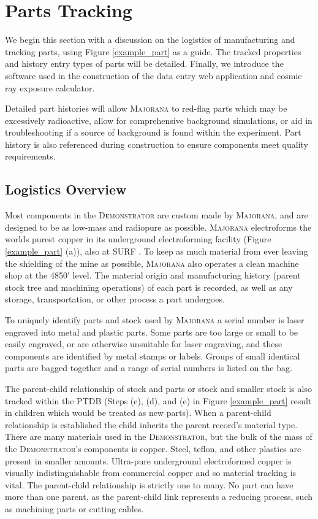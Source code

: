 \documentclass[journal]{IEEEtran}
\begin{document}
\section{Parts Tracking}
We begin this section with a discussion on the logistics of manufacturing and tracking parts, using Figure \ref{example_part}
as a guide. The tracked properties and history entry types of parts will be detailed. Finally, we introduce the
software used in the construction of the data entry web application and cosmic ray exposure calculator.

Detailed part histories will allow \textsc{Majorana}
to red-flag parts which may be excessively radioactive, allow for comprehensive background simulations,
or aid in troubleshooting if a source of background is found within the experiment.
Part history is also referenced during construction to ensure components meet quality requirements.

\subsection{Logistics Overview}
Most components in the \textsc{Demonstrator} are custom made by \textsc{Majorana}, and are designed
to be as low-mass and radiopure as possible. 
\textsc{Majorana} electroforms the worlds purest copper in its underground electroforming facility (Figure \ref{example_part} (a)), also at SURF \cite{mj_wilkerson}.
To keep as much material from ever leaving the shielding of the mine as possible, \textsc{Majorana} also operates a clean 
machine shop at the 4850' level. The material origin and manufacturing history (parent stock tree and machining operations) 
of each part is recorded, as well as any storage, transportation, or other process a part undergoes.

To uniquely identify parts and stock used by \textsc{Majorana} a serial number is laser engraved into metal and plastic parts.
Some parts are too large or small to be easily engraved, or are otherwise unsuitable for laser engraving, and these
components are identified by metal stamps or labels. Groups of small identical parts are bagged together
and a range of serial numbers is listed on the bag.

The parent-child relationship of stock and parts or stock and smaller stock is also tracked
within the PTDB (Steps (c), (d), and (e) in Figure \ref{example_part} result in children which would be treated as new parts).
When a parent-child relationship is established the child inherits the parent record's material type. 
There are many materials used in the \textsc{Demonstrator}, but the bulk of the mass of the \textsc{Demonstrator}'s components is copper.
Steel, teflon, and other plastics are present in smaller amounts. 
Ultra-pure underground electroformed copper is visually indistinguishable from commercial copper and so material
tracking is vital.
The parent-child relationship is strictly one to many. No part can have more than one parent, as the parent-child link
represents a reducing process, such as machining parts or cutting cables. 
\end{document}
